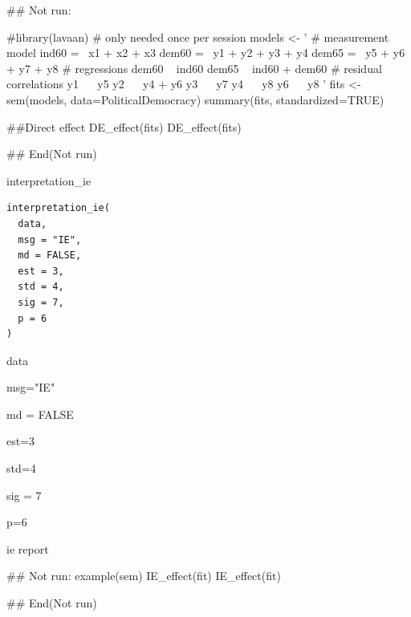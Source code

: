 \documentclass[a4paper]{book}
\begin{document}
\begin{Examples}
\begin{ExampleCode}

\#\# Not run: 

 #library(lavaan) # only needed once per session
 models <- '
   # measurement model
     ind60 =~ x1 + x2 + x3
     dem60 =~ y1 + y2 + y3 + y4
     dem65 =~ y5 + y6 + y7 + y8
 # regressions
     dem60 ~ ind60
     dem65 ~ ind60 + dem60
   # residual correlations
     y1 ~~ y5
     y2 ~~ y4 + y6
     y3 ~~ y7
     y4 ~~ y8
    y6 ~~ y8
 '
 fits <- sem(models, data=PoliticalDemocracy)
 summary(fits, standardized=TRUE)

 ##Direct effect
 DE_effect(fits)
 DE_effect(fits)%


## End(Not run)

\end{ExampleCode}
\end{Examples}
%
\begin{Description}
interpretation\_ie
\end{Description}
%
\begin{Usage}
\begin{verbatim}
interpretation_ie(
  data,
  msg = "IE",
  md = FALSE,
  est = 3,
  std = 4,
  sig = 7,
  p = 6
)
\end{verbatim}
\end{Usage}
%
\begin{Arguments}
\begin{ldescription}
\item[\code{data}] data

\item[\code{msg}] msg="IE"

\item[\code{md}] md = FALSE

\item[\code{est}] est=3

\item[\code{std}] std=4

\item[\code{sig}] sig = 7

\item[\code{p}] p=6
\end{ldescription}
\end{Arguments}
%
\begin{Value}
ie report
\end{Value}
%
\begin{Examples}
\begin{ExampleCode}

\#\# Not run: 
example(sem)
IE_effect(fit)
IE_effect(fit) %

## End(Not run)
\end{ExampleCode}
\end{Examples}
\end{document}
